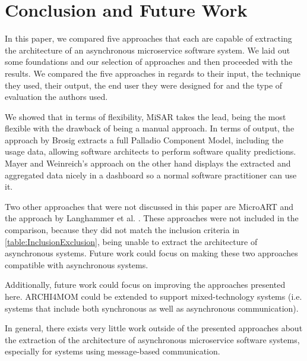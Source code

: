 
\section{Conclusion and Future Work}
\label{cha:Conclusion}
In this paper, we compared five approaches that each are capable of extracting the architecture of an asynchronous microservice software system.
We laid out some foundations and our selection of approaches and then proceeded with the results.
We compared the five approaches in regards to their input, the technique they used, their output, the end user they were designed for and the type of evaluation the authors used.

We showed that in terms of flexibility, MiSAR \cite{Alshuqayran2018MiSAR} takes the lead, being the most flexible with the drawback of being a manual approach.
In terms of output, the approach by Brosig \cite{Brosig2011} extracts a full Palladio Component Model, including the usage data, allowing software architects to perform software quality predictions.
Mayer and Weinreich's approach \cite{Mayer2018} on the other hand displays the extracted and aggregated data nicely in a dashboard so a normal software practitioner can use it.

Two other approaches that were not discussed in this paper are MicroART \cite{Granchelli2017MicroART} and the approach by Langhammer et al. \cite{Langhammer2016}.
These approaches were not included in the comparison, because they did not match the inclusion criteria in \autoref{table:InclusionExclusion}, being unable to extract the architecture of asynchronous systems.
Future work could focus on making these two approaches compatible with asynchronous systems.

Additionally, future work could focus on improving the approaches presented here.
ARCHI4MOM could be extended to support mixed-technology systems (i.e. systems that include both synchronous as well as asynchronous communication).

In general, there exists very little work outside of the presented approaches about the extraction of the architecture of asynchronous microservice software systems, especially for systems using message-based communication.